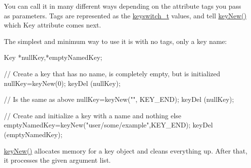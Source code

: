 You can call it in many different ways depending on the attribute tags you pass as parameters. Tags are represented as the \hyperlink{group__key_ga91fb3178848bd682000958089abbaf40}{keyswitch\_\-t} values, and tell \hyperlink{group__key_gaf6893c038b3ebee90c73a9ea8356bebf}{keyNew()} which Key attribute comes next.

The simplest and minimum way to use it is with no tags, only a key name: 
\begin{DoxyCode}
Key *nullKey,*emptyNamedKey;

// Create a key that has no name, is completely empty, but is initialized
nullKey=keyNew(0);
keyDel (nullKey);

// Is the same as above
nullKey=keyNew("", KEY_END);
keyDel (nullKey);

// Create and initialize a key with a name and nothing else
emptyNamedKey=keyNew("user/some/example",KEY_END);
keyDel (emptyNamedKey);
\end{DoxyCode}


\hyperlink{group__key_gaf6893c038b3ebee90c73a9ea8356bebf}{keyNew()} allocates memory for a key object and cleans everything up. After that, it processes the given argument list.

